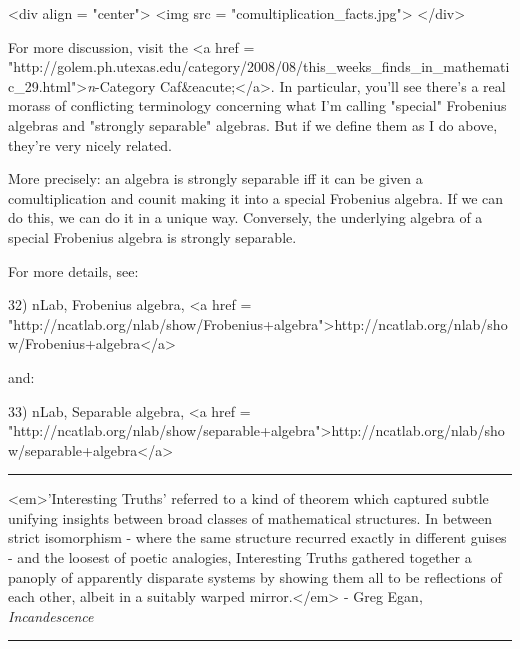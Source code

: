 <div align = "center">
<img src = "comultiplication_facts.jpg">
</div>

For more discussion, visit the 
<a href = "http://golem.ph.utexas.edu/category/2008/08/this_weeks_finds_in_mathematic_29.html">\emph{n}-Category 
Caf&eacute;</a>.  In particular, you'll see there's a real
morass of conflicting terminology concerning what I'm calling
"special" Frobenius algebras and "strongly 
separable" algebras.  But if we define them as I do above,
they're very nicely related.

More precisely: an algebra is strongly separable iff it can be given a
comultiplication and counit making it into a special Frobenius
algebra.  If we can do this, we can do it in a unique way.
Conversely, the underlying algebra of a special Frobenius algebra is
strongly separable.

For more details, see:

32) nLab, Frobenius algebra,
<a href = "http://ncatlab.org/nlab/show/Frobenius+algebra">http://ncatlab.org/nlab/show/Frobenius+algebra</a>

and: 

33) nLab, Separable algebra, <a href = "http://ncatlab.org/nlab/show/separable+algebra">http://ncatlab.org/nlab/show/separable+algebra</a>

\par\noindent\rule{\textwidth}{0.4pt}
 
<em>'Interesting Truths' referred to a kind of theorem which
captured subtle unifying insights between broad classes of
mathematical structures. In between strict isomorphism - where the
same structure recurred exactly in different guises - and the loosest
of poetic analogies, Interesting Truths gathered together a panoply of
apparently disparate systems by showing them all to be reflections of
each other, albeit in a suitably warped mirror.</em> - Greg Egan,
\emph{Incandescence}

\par\noindent\rule{\textwidth}{0.4pt}

